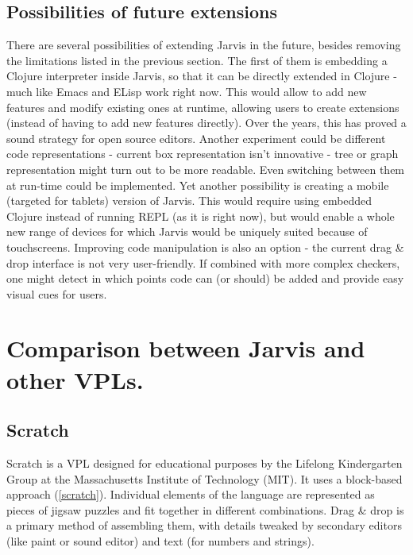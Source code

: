 \documentclass[11pt]{scrartcl}
\begin{document}
\subsection{Possibilities of future extensions}
There are several possibilities of extending Jarvis in the future, besides removing the limitations listed in the previous section. The first of them is embedding a Clojure interpreter inside Jarvis, so that it can be directly extended in Clojure - much like Emacs and ELisp work right now. This would allow to add new features and modify existing ones at runtime, allowing users to create extensions (instead of having to add new features directly). Over the years, this has proved a sound strategy for open source editors. Another experiment could be different code representations - current box representation isn’t innovative - tree or graph representation might turn out to be more readable. Even switching between them at run-time could be implemented. Yet another possibility is creating a mobile (targeted for tablets) version of Jarvis. This would require using embedded Clojure instead of running REPL (as it is right now), but would enable a whole new range of devices for which Jarvis would be uniquely suited because of touchscreens. Improving code manipulation is also an option - the current drag \& drop interface is not very user-friendly. If combined with more complex checkers, one might detect in which points code can (or should) be added and provide easy visual cues for users.

\section{Comparison between Jarvis and other VPLs.}
\subsection{Scratch}
Scratch is a VPL designed for educational purposes by the Lifelong Kindergarten Group at the Massachusetts Institute of Technology (MIT). It uses a block-based approach (\ref{scratch}). Individual elements of the language are represented as pieces of jigsaw puzzles and fit together in different combinations. Drag \& drop is a primary method of assembling them, with details tweaked by secondary editors (like paint or sound editor) and text (for numbers and strings).
\end{document}
